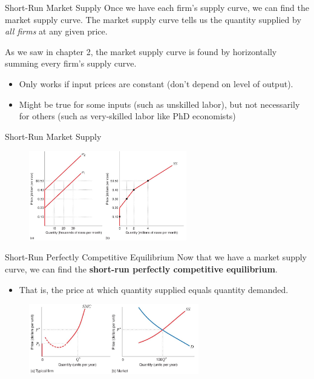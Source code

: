 \documentclass[11pt,t]{beamer}
\begin{document}
\begin{frame}{Short-Run Market Supply}
  Once we have each firm's supply curve, we can find the market supply curve. The market supply curve tells us the quantity supplied by \textit{all firms} at any given price.

  \pause\bigskip
  As we saw in chapter 2, the market supply curve is found by horizontally summing every firm's supply curve.

  \begin{itemize}
    \item Only works if input prices are constant (don't depend on level of output).
    
    \item Might be true for some inputs (such as unskilled labor), but not necessarily for others (such as very-skilled labor like PhD economists)
  \end{itemize}

\end{frame}

\begin{frame}{Short-Run Market Supply}
  \begin{figure}
    \includegraphics[width=260px]{figures/fig9_6.jpg}
  \end{figure}
\end{frame}

\begin{frame}{Short-Run Perfectly Competitive Equilibrium}
  Now that we have a market supply curve, we can find the \textbf{short-run perfectly competitive equilibrium}.

  \begin{itemize}
    \item That is, the price at which quantity supplied equals quantity demanded.
  \end{itemize}

  \bigskip
  \begin{figure}
    \includegraphics[width=280px]{figures/fig9_8.jpg}
  \end{figure}
\end{frame}
\end{document}
